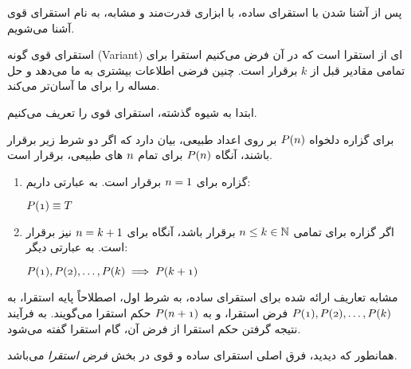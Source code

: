 پس از آشنا شدن با استقرای ساده، با ابزاری قدرت‌مند‌ و مشابه، به نام استقرای قوی آشنا می‌شویم.


استقرای قوی گونه (Variant)
ای از استقرا است که در آن فرض می‌کنیم استقرا برای تمامی مقادیر قبل از
$k$
برقرار است.
چنین فرضی اطلاعات بیشتری به ما می‌دهد و حل مساله را برای ما آسان‌تر می‌کند.

ابتدا به شیوه گذشته، استقرای قوی را تعریف می‌کنیم.

    \begin{DEFINITION}
        برای گزاره دلخواه
        $\mathnormal{P(n)}$
        بر روی اعداد طبیعی،
        بیان دارد که اگر دو شرط زیر برقرار باشند، آنگاه
        $\mathnormal{P(n)}$
        برای تمام 
        $\mathnormal{n}$
        های طبیعی، برقرار است.

        \begin{enumerate}
            \item گزاره برای 
                    $\mathnormal{n} = 1$
                     برقرار است. به عبارتی داریم:
                    \begin{flushleft}
                        $\mathnormal{P(1)} \equiv T$
                    \end{flushleft}
                    
            \item اگر گزاره برای تمامی
                    $\mathnormal{n} \leq k \in \mathbb{N}$
                    برقرار باشد، آنگاه برای
                    $\mathnormal{n} = k + 1$
                    نیز برقرار است. به عبارتی دیگر:
                    \begin{flushleft} 
                        $\mathnormal{P(1)}, \mathnormal{P(2)}, \ldots, \mathnormal{P(k)} \implies \mathnormal{P(k + 1)}$
                    \end{flushleft}

        \end{enumerate} 

        مشابه تعاریف ارائه شده برای استقرای ساده،
        به شرط اول، اصطلاحاً پایه استقرا، به 
        $\mathnormal{P(1)}, \mathnormal{P(2)}, \ldots, \mathnormal{P(k)}$
        فرض استقرا،
        و به
        $\mathnormal{P(n + 1)}$
        حکم استقرا می‌گویند.
        به فرآیند نتیجه گرفتن حکم استقرا از فرض آن، گام استقرا گفته می‌شود.


    \end{DEFINITION}

    همانطور که دیدید، فرق اصلی استقرای ساده و قوی در بخش
    \textit{فرض استقرا}
    می‌باشد.

